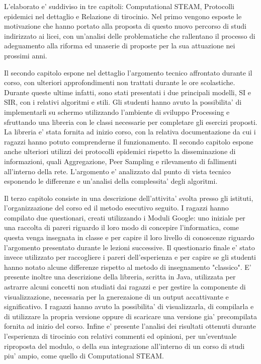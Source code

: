 L'elaborato e' suddiviso in tre capitoli: Computational STEAM, Protocolli epidemici nel dettaglio e Relazione di tirocinio. Nel primo vengono esposte le motivazione che hanno portato alla proposta di questo nuovo percorso di studi indirizzato ai licei, con un'analisi delle problematiche che rallentano il processo di adeguamento alla riforma ed unaserie di proposte per la sua attuazione nei prossimi anni. 

Il secondo capitolo espone nel dettaglio l'argomento tecnico affrontato durante il corso, con ulteriori approfondimenti non trattati durante le ore scolastiche. Durante queste ultime infatti, sono stati presentati i due principali modelli, SI e SIR, con i relativi algoritmi e stili. Gli studenti hanno avuto la possibilita' di implementarli su schermo utilizzando l'ambiente di sviluppo Processing e sfruttando una libreria con le classi necessarie per completare gli esercizi proposti. La libreria e' stata fornita ad inizio corso, con la relativa documentazione da cui i ragazzi hanno potuto comprenderne il funzionamento. Il secondo capitolo espone anche ulteriori utilizzi dei protocolli epidemici rispetto la disseminazione di informazioni, quali Aggregazione, Peer Sampling e rilevamento di fallimenti all'interno della rete. L'argomento e' analizzato dal punto di vista tecnico esponendo le differenze e un'analisi della complessita' degli algoritmi.

Il terzo capitolo consiste in una descrizione dell'attivita' svolta presso gli istituti, l'organizzazione del corso ed il metodo esecutivo seguito. I ragazzi hanno compilato due questionari, creati utilizzando i Moduli Google: uno iniziale per una raccolta di pareri riguardo il loro modo di concepire l'informatica, come questa venga insegnata in classe e per capire il loro livello di conoscenze riguardo l'argomento presentato durante le lezioni successive. Il questionario finale e' stato invece utilizzato per raccogliere i pareri dell'esperienza e per capire se gli studenti hanno notato alcune differenze rispetto al metodo di insegnamento "classico". E' presente inoltre una descrizione della libreria, scritta in Java, utilizzata per astrarre alcuni concetti non studiati dai ragazzi e per gestire la componente di visualizzazione, necessaria per la gnerezaione di un output accattivante e significativo. I ragazzi hanno avuto la possibilita' di visualizzarla, di compilarla e di utilizzare la propria versione oppure di scaricare una versione gia' precompilata fornita ad inizio del corso. Infine e' presente l'analisi dei risultati ottenuti durante l'esperienza di tirocinio con relativi commenti ed opinioni, per un'eventuale riproposta del modulo, o della sua integrazione all'interno di un corso di studi piu' ampio, come quello di Computational STEAM.

